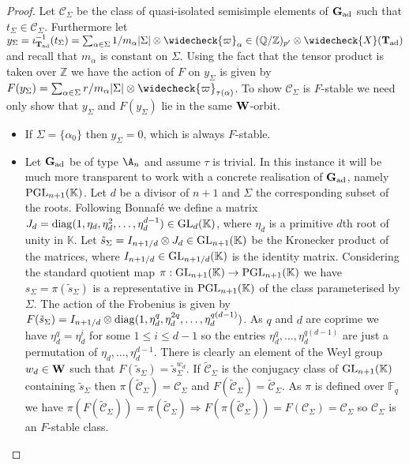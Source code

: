 \documentclass[eqthmnum]{jt-calcs}
\begin{document}
\begin{proof}
Let $\mathcal{C}_{\Sigma}$ be the class of quasi-isolated semisimple elements of $\mathbf{G}_{\operatorname{ad}}$ such that $t_{\Sigma} \in \mathcal{C}_{\Sigma}$. Furthermore let $y_{\Sigma} = \imath_{\bT_{\ad}}^{-1}(t_{\Sigma}) = \sum_{\alpha  \in \Sigma} 1/m_{\alpha}|\Sigma|\otimes\widecheck{\varpi}_{\alpha} \in (\mathbb{Q/Z})_{p'} \otimes \widecheck{X}(\bT_{\ad})$ and recall that $m_{\alpha}$ is constant on $\Sigma$. Using the fact that the tensor product is taken over $\mathbb{Z}$ we have the action of $F$ on $y_{\Sigma}$ is given by $F(y_{\Sigma}) = \sum_{\alpha  \in \Sigma} r/m_{\alpha}|\Sigma|\otimes\widecheck{\varpi}_{\tau(\alpha)}$. To show $\mathcal{C}_{\Sigma}$ is $F$-stable we need only show that $y_{\Sigma}$ and $F(y_{\Sigma})$ lie in the same $\mathbf{W}$-orbit.
\begin{itemize}
	\item If $\Sigma = \{\alpha_0\}$ then $y_{\Sigma} = 0$, which is always $F$-stable.
	
	\item Let $\mathbf{G}_{\operatorname{ad}}$ be of type $\A_n$ and assume $\tau$ is trivial. In this instance it will be much more transparent to work with a concrete realisation of $\mathbf{G}_{\operatorname{ad}}$, namely $\operatorname{PGL}_{n+1}(\mathbb{K})$. Let $d$ be a divisor of $n+1$ and $\Sigma$ the corresponding subset of the roots. Following Bonnaf\'{e} we define a matrix $J_d = \operatorname{diag}(1,\eta_d,\eta_d^2,\dots,\eta_d^{d-1}) \in \operatorname{GL}_d(\mathbb{K})$, where $\eta_d$ is a primitive $d$th root of unity in $\mathbb{K}$. Let $\tilde{s}_{\Sigma} = I_{n+1/d} \otimes J_d \in \operatorname{GL}_{n+1}(\mathbb{K})$ be the Kronecker product of the matrices, where $I_{n+1/d} \in\operatorname{GL}_{n+1/d}(\mathbb{K})$ is the identity matrix. Considering the standard quotient map $\pi : \operatorname{GL}_{n+1}(\mathbb{K}) \to \operatorname{PGL}_{n+1}(\mathbb{K})$ we have $s_{\Sigma} = \pi(\tilde{s}_{\Sigma})$ is a representative in $\operatorname{PGL}_{n+1}(\mathbb{K})$ of the class parameterised by $\Sigma$. The action of the Frobenius is given by $F(\tilde{s}_{\Sigma}) = I_{n+1/d} \otimes \operatorname{diag}(1,\eta_d^q,\eta_d^{2q},\dots,\eta_d^{q(d-1)})$. As $q$ and $d$ are coprime we have $\eta_d^{q} = \eta_d^i$ for some $1 \leqslant i \leqslant d-1$ so the entries $\eta_d^q,\dots,\eta_d^{q(d-1)}$ are just a permutation of $\eta_d,\dots,\eta_d^{d-1}$. There is clearly an element of the Weyl group $w_d \in \mathbf{W}$ such that $F(\tilde{s}_{\Sigma}) = \tilde{s}_{\Sigma}^{w_d}$. If $\tilde{\mathcal{C}}_{\Sigma}$ is the conjugacy class of $\operatorname{GL}_{n+1}(\mathbb{K})$ containing $\tilde{s}_{\Sigma}$ then $\pi(\tilde{\mathcal{C}}_{\Sigma}) = \mathcal{C}_{\Sigma}$ and $F(\tilde{\mathcal{C}}_{\Sigma}) = \mathcal{\tilde{C}}_{\Sigma}$. As $\pi$ is defined over $\mathbb{F}_q$ we have $\pi(F(\tilde{\mathcal{C}}_{\Sigma})) = \pi(\tilde{\mathcal{C}}_{\Sigma}) \Rightarrow F(\pi(\tilde{\mathcal{C}}_{\Sigma})) = F(\mathcal{C}_{\Sigma}) = \mathcal{C}_{\Sigma}$ so $\mathcal{C}_{\Sigma}$ is an $F$-stable class.
	

\end{itemize}
\end{proof}
\end{document}
